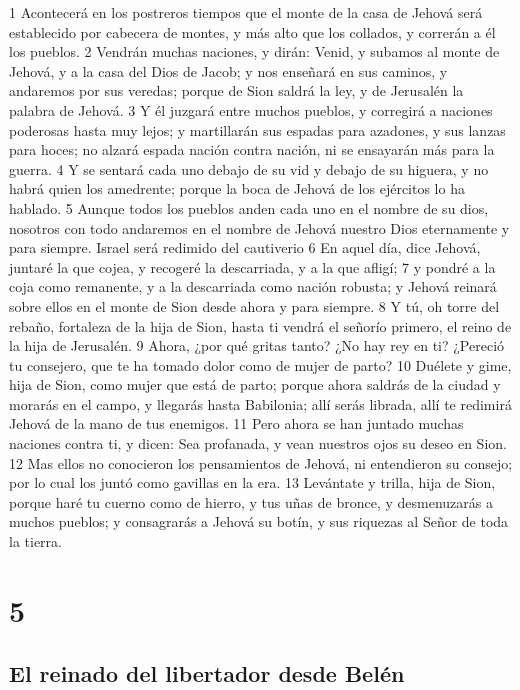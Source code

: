 1 Acontecerá en los postreros tiempos que el monte de la casa de Jehová será establecido por cabecera de montes, y más alto que los collados, y correrán a él los pueblos.
2 Vendrán muchas naciones, y dirán: Venid, y subamos al monte de Jehová, y a la casa del Dios de Jacob; y nos enseñará en sus caminos, y andaremos por sus veredas; porque de Sion saldrá la ley, y de Jerusalén la palabra de Jehová.
3 Y él juzgará entre muchos pueblos, y corregirá a naciones poderosas hasta muy lejos; y martillarán sus espadas para azadones, y sus lanzas para hoces; no alzará espada nación contra nación, ni se ensayarán más para la guerra.
4 Y se sentará cada uno debajo de su vid y debajo de su higuera, y no habrá quien los amedrente; porque la boca de Jehová de los ejércitos lo ha hablado.
5 Aunque todos los pueblos anden cada uno en el nombre de su dios, nosotros con todo andaremos en el nombre de Jehová nuestro Dios eternamente y para siempre.
Israel será redimido del cautiverio
6 En aquel día, dice Jehová, juntaré la que cojea, y recogeré la descarriada, y a la que afligí;
7 y pondré a la coja como remanente, y a la descarriada como nación robusta; y Jehová reinará sobre ellos en el monte de Sion desde ahora y para siempre.
8 Y tú, oh torre del rebaño, fortaleza de la hija de Sion, hasta ti vendrá el señorío primero, el reino de la hija de Jerusalén.
9 Ahora, ¿por qué gritas tanto? ¿No hay rey en ti? ¿Pereció tu consejero, que te ha tomado dolor como de mujer de parto?
10 Duélete y gime, hija de Sion, como mujer que está de parto; porque ahora saldrás de la ciudad y morarás en el campo, y llegarás hasta Babilonia; allí serás librada, allí te redimirá Jehová de la mano de tus enemigos.
11 Pero ahora se han juntado muchas naciones contra ti, y dicen: Sea profanada, y vean nuestros ojos su deseo en Sion.
12 Mas ellos no conocieron los pensamientos de Jehová, ni entendieron su consejo; por lo cual los juntó como gavillas en la era.
13 Levántate y trilla, hija de Sion, porque haré tu cuerno como de hierro, y tus uñas de bronce, y desmenuzarás a muchos pueblos; y consagrarás a Jehová su botín, y sus riquezas al Señor de toda la tierra.

\chapter{5}

\section*{El reinado del libertador desde Belén}

